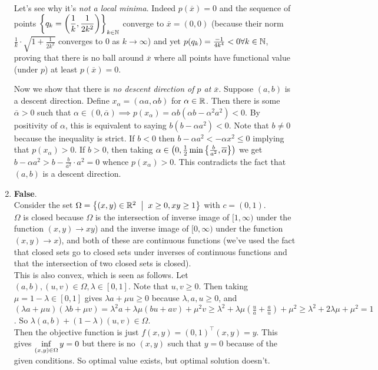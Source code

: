 \begin{enumerate}[leftmargin=*]
Let's see why it's \textit{not a local minima}. Indeed $p(\overline x) = 0$ and the sequence of points $\displaystyle\left\{q_k=\left(\frac{1}{k},\frac{1}{2k^2}\right)\right\}_{k\in\mathbb{N}}$ converge to $\overline x = (0,0)$ (because their norm $\frac{1}{k}\cdot \sqrt{1+\frac{1}{2k^2}}$ converges to $0$ as $k\to\infty$) and yet $p(q_k) = \frac{-1}{4k^4}<0\forall k\in\mathbb{N}$, proving that there is no ball around $\overline x$ where all points have functional value (under $p$) at least $p(\overline x) = 0$.

Now we show that there is \textit{no descent direction of $p$ at $\overline x$}. Suppose $(a,b)$ is a descent direction. Define $x_\alpha = (\alpha a,\alpha b)$ for $\alpha\in \mathbb{R}$. Then there is some $\overline \alpha>0$ such that $\alpha\in(0,\overline \alpha)\implies p(x_\alpha) = \alpha b(\alpha b-\alpha^2a^2)<0$. By positivity of $\alpha$, this is equivalent to saying $b(b-\alpha a^2)<0$. Note that $b\neq 0$ because the inequality is strict. If $b<0$ then $b-\alpha a^2 < -\alpha x^2 \leq 0$ implying that $p(x_\alpha) > 0$. If $b>0$, then taking $\alpha\in \left(0,\frac{1}{2}\min\left\{\frac{b}{a^2},\overline \alpha\right\}\right)$ we get $b-\alpha a^2 > b-\frac{b}{a^2}\cdot a^2 = 0$ whence $p(x_\alpha)>0$. This contradicts the fact that $(a,b)$ is a descent direction.

\item \textbf{False}.\\
Consider the set $\Omega = \set{(x,y)\in \R^2\st x\geq0, xy\geq 1}$ with $c=(0,1)$. \\
$\Omega$ is closed because $\Omega$ is the intersection of inverse image of $[1,\infty)$ under the function $(x,y)\to xy$) and the inverse image of $[0,\infty)$ under the function $(x,y)\to x$), and both of these are continuous functions (we've used the fact that closed sets go to closed sets under inverses of continuous functions and that the intersection of two closed sets is closed). \\
This is also convex, which is seen as follows. Let $(a,b),(u,v)\in \Omega, \lambda\in[0,1]$. Note that $u,v\geq 0$. Then taking $\mu=1-\lambda\in[0,1]$ gives $\lambda a + \mu u \geq 0$ because $\lambda,a,u\geq 0$, and $(\lambda a + \mu u)(\lambda b + \mu v) = \lambda^2 a + \lambda\mu(bu+av) + \mu^2 v \geq \lambda^2 + \lambda\mu\left(\frac{u}{a} + \frac{a}{u}\right) + \mu^2 \ge \lambda^2 + 2\lambda\mu + \mu^2 = 1$. So $\lambda (a,b) + (1-\lambda)(u,v) \in\Omega$.\\
Then the objective function is just $f(x,y) = (0,1)^\top(x,y) = y$. This gives $\displaystyle\inf_{(x,y)\in\Omega} y = 0$ but there is no $(x,y)$ such that $y=0$ because of the given conditions. So optimal value exists, but optimal solution doesn't.
\end{enumerate}









